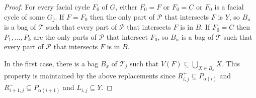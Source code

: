 \documentclass{patmorin}
\newcommand{\PP}{\mathcal{P}}
\renewcommand{\leq}{\leqslant}
\begin{document}
\begin{proof}
For every facial cycle $F_0$ of $G$, either $F_0=F$ or $F_0=C$ or $F_0$ is a facial cycle of some $G_j$. If $F=F_0$ then the only part of $\PP$ that intersects $F$ is $Y$, so $B_u$ is a bag of $\mathcal{T}$ such that every part of $\PP$ that intersects $F$ is in $B$. If $F_0=C$ then $P_1,\dots,P_k$ are the only parts of $\PP$ that intersect $F_0$, so $B_u$ is a bag of $\mathcal{T}$ such that every part of $\PP$ that intersects $F$ is in $B$.

In the first case, there is a bag $B_x$ of $\mathcal{T}_j$ such that $V(F)\subseteq \bigcup_{X\in B_x} X$. This property is maintained by the above replacements since
$R_{i,j}^+ \subseteq P_{\alpha(i)}$ and
$R_{i+1,j}^- \subseteq P_{\alpha(i+1)}$ and
$L_{i,j}\subseteq Y$.






\end{proof}
\end{document}
